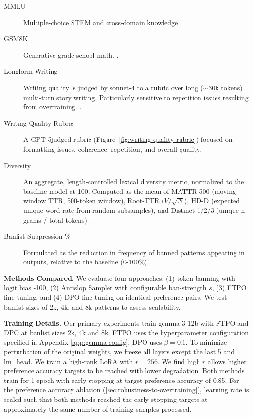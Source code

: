 \documentclass[11pt]{article}
\begin{document}
\begin{description}
  \item[MMLU] Multiple-choice STEM and cross-domain knowledge \citep{hendrycks2021mmlu}.
  \item[GSM8K] Generative grade-school math. \citep{cobbe2021gsm8k}.
  \item[Longform Writing] Writing quality is judged by sonnet-4 to a rubric over long (\(\sim\)30k tokens) multi-turn story writing. Particularly sensitive to repetition issues resulting from overtraining. \citep{paech2025longform}.
  
  \item[Writing-Quality Rubric] A GPT-5\textendash judged rubric (Figure~\ref{fig:writing-quality-rubric}) focused on formatting issues, coherence, repetition, and overall quality.
  \item[Diversity] An aggregate, length-controlled lexical diversity metric, normalized to the baseline model at 100. Computed as the mean of MATTR-500 (moving-window TTR, 500-token window), Root-TTR (\(V/\sqrt{N}\)), HD-D (expected unique-word rate from random subsamples), and Distinct-1/2/3 (unique n-grams / total tokens) \citep{Guiraud1960,McCarthyJarvis2010HDD,Li2016Distinct}.
  \item[Banlist Suppression \%] Formulated as the reduction in frequency of banned patterns appearing in outputs, relative to the baseline (0-100\%).
\end{description}



\textbf{Methods Compared.} We evaluate four approaches: (1) token banning with logit bias -100, (2) Antislop Sampler with configurable ban-strength $s$, (3) FTPO fine-tuning, and (4) DPO fine-tuning on identical preference pairs. We test banlist sizes of 2k, 4k, and 8k patterns to assess scalability.

\textbf{Training Details.} Our primary experiments train gemma-3-12b with FTPO and DPO at banlist sizes 2k, 4k and 8k. FTPO uses the hyperparameter configuration specified in Appendix \ref{app:gemma-config}. DPO uses $\beta=0.1$. To minimize perturbation of the original weights, we freeze all layers except the last 5 and lm\_head. We train a high-rank LoRA \citep{hu2021lora} with $r=256$. We find high $r$ allows higher preference accuracy targets to be reached with lower degradation. Both methods train for 1 epoch with early stopping at target preference accuracy of 0.85. For the preference accuracy ablation (\ref{sec:robustness-to-overtraining}), learning rate is scaled such that both methods reached the early stopping targets at approximately the same number of training samples processed.
\end{document}
